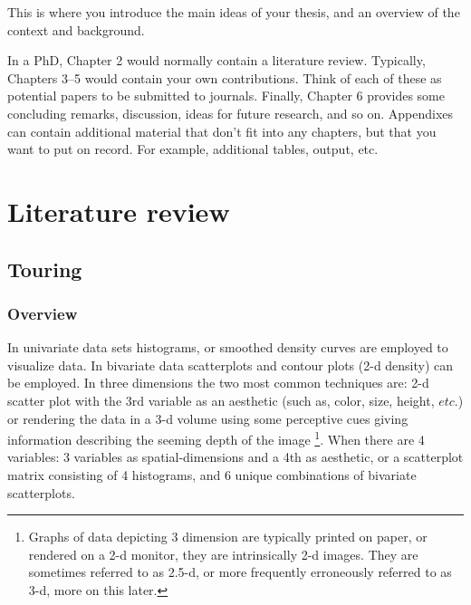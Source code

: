\documentclass{monashthesis}
\begin{document}
This is where you introduce the main ideas of your thesis, and an overview of the context and background.

In a PhD, Chapter 2 would normally contain a literature review. Typically, Chapters 3--5 would contain your own contributions. Think of each of these as potential papers to be submitted to journals. Finally, Chapter 6 provides some concluding remarks, discussion, ideas for future research, and so on. Appendixes can contain additional material that don't fit into any chapters, but that you want to put on record. For example, additional tables, output, etc.

\hypertarget{ch:lit_review}{%
\chapter{Literature review}\label{ch:lit_review}}

\hypertarget{sec:tour}{%
\section{Touring}\label{sec:tour}}

\hypertarget{overview}{%
\subsection{Overview}\label{overview}}

In univariate data sets histograms, or smoothed density curves are employed to visualize data. In bivariate data scatterplots and contour plots (2-d density) can be employed. In three dimensions the two most common techniques are: 2-d scatter plot with the 3rd variable as an aesthetic (such as, color, size, height, \(etc.\)) or rendering the data in a 3-d volume using some perceptive cues giving information describing the seeming depth of the image \footnote{Graphs of data depicting 3 dimension are typically printed on paper, or rendered on a 2-d monitor, they are intrinsically 2-d images. They are sometimes referred to as 2.5-d, or more frequently erroneously referred to as 3-d, more on this later.}. When there are 4 variables: 3 variables as spatial-dimensions and a 4th as aesthetic, or a scatterplot matrix consisting of 4 histograms, and 6 unique combinations of bivariate scatterplots.
\end{document}
